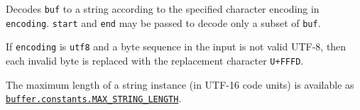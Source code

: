 Decodes \texttt{buf} to a string according to the specified character
encoding in \texttt{encoding}. \texttt{start} and \texttt{end} may be
passed to decode only a subset of \texttt{buf}.

If \texttt{encoding} is
\texttt{\textquotesingle{}utf8\textquotesingle{}} and a byte sequence in
the input is not valid UTF-8, then each invalid byte is replaced with
the replacement character \texttt{U+FFFD}.

The maximum length of a string instance (in UTF-16 code units) is
available as
\hyperref[bufferconstantsmax_string_length]{\texttt{buffer.constants.MAX\_STRING\_LENGTH}}.

\begin{Shaded}
\begin{Highlighting}[]
\NormalTok{ \{ }\NormalTok{ \} } \OperatorTok{;}

\OperatorTok{=} \NormalTok{(}\NormalTok{)}\OperatorTok{;}

\NormalTok{ (}\OperatorTok{=} \OperatorTok{;}\OperatorTok{\textless{}} \OperatorTok{;}\OperatorTok{++}\NormalTok{) \{}
\OperatorTok{=}\OperatorTok{+} \OperatorTok{;}
\NormalTok{\}}

\NormalTok{(}\NormalTok{))}\OperatorTok{;}
\NormalTok{(}\OperatorTok{,} \OperatorTok{,} \NormalTok{))}\OperatorTok{;}

\OperatorTok{=} \NormalTok{(}\NormalTok{)}\OperatorTok{;}


\end{Highlighting}
\end{Shaded}
